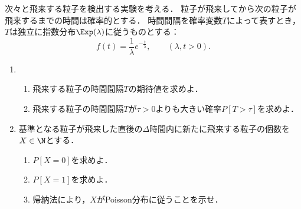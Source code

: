 \documentclass[uplatex,dvipdfmx]{jsarticle}
\begin{document}
\begin{tcolorbox}[colframe=ForestGreen, colback=ForestGreen!10!white,breakable,colbacktitle=ForestGreen!40!white,coltitle=black,fonttitle=\bfseries\sffamily,
    title=第２問]
    \begin{problem}
        次々と飛来する粒子を検出する実験を考える．
        粒子が飛来してから次の粒子が飛来するまでの時間は確率的とする．
        時間間隔を確率変数$T$によって表すとき，$T$は独立に指数分布$\Exp(\lambda)$に従うものとする：
        \[f(t)=\frac{1}{\lambda}e^{-\frac{t}{\lambda}},\qquad(\lambda,t>0).\]
        \begin{enumerate}[{問}1]
            \item 
            \begin{enumerate}
                \item 飛来する粒子の時間間隔$T$の期待値を求めよ．
                \item 飛来する粒子の時間間隔$T$が$\tau>0$よりも大きい確率$P[T>\tau]$を求めよ．
            \end{enumerate}
            \item 基準となる粒子が飛来した直後の$\Delta$時間内に新たに飛来する粒子の個数を$X\in\N$とする．
            \begin{enumerate}
                \item $P[X=0]$を求めよ．
                \item $P[X=1]$を求めよ．
                \item 帰納法により，$X$がPoisson分布に従うことを示せ．
            \end{enumerate}
        \end{enumerate}
    \end{problem}
\end{tcolorbox}
\end{document}
